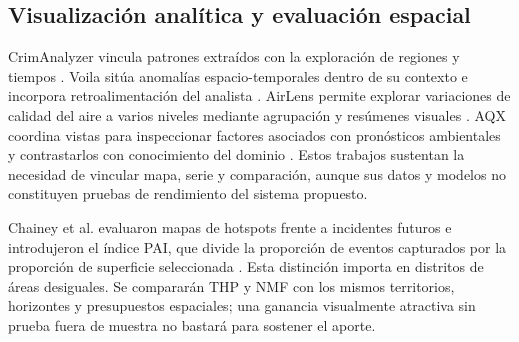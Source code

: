 \documentclass[10pt,a4paper,twocolumn]{article}
\begin{document}
\subsection{Visualización analítica y evaluación espacial}
CrimAnalyzer vincula patrones extraídos con la exploración de regiones y tiempos \cite{garcia2021crimanalyzer}. Voila sitúa anomalías espacio-temporales dentro de su contexto e incorpora retroalimentación del analista \cite{cao2018voila}. AirLens permite explorar variaciones de calidad del aire a varios niveles mediante agrupación y resúmenes visuales \cite{qu2022airlens}. AQX coordina vistas para inspeccionar factores asociados con pronósticos ambientales y contrastarlos con conocimiento del dominio \cite{velumani2022aqx}. Estos trabajos sustentan la necesidad de vincular mapa, serie y comparación, aunque sus datos y modelos no constituyen pruebas de rendimiento del sistema propuesto.

Chainey et al. evaluaron mapas de hotspots frente a incidentes futuros e introdujeron el índice PAI, que divide la proporción de eventos capturados por la proporción de superficie seleccionada \cite{chainey2008utility}. Esta distinción importa en distritos de áreas desiguales. Se compararán THP y NMF con los mismos territorios, horizontes y presupuestos espaciales; una ganancia visualmente atractiva sin prueba fuera de muestra no bastará para sostener el aporte.
\end{document}

